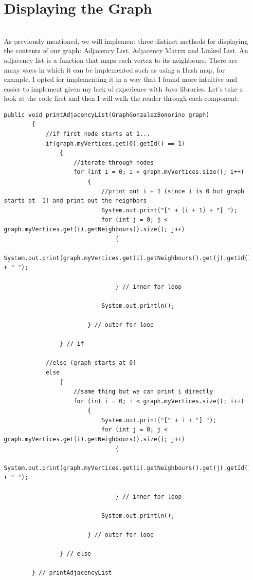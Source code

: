 \documentclass[letterpaper, 10pt]{article}
\begin{document}
\section{Displaying the Graph}
\\
As previously mentioned, we will implement three distinct methods for displaying the contents of our graph: Adjacency List, Adjacency Matrix and Linked List. An adjacency list is a function that maps each vertex to its neighbours. There are many ways in which it can be implemented such as using a Hash map, for example. I opted for implementing it in a way that I found more intuitive and easier to implement given my lack of experience with Java libraries. Let's take a look at the code first and then I will walk the reader through each component:
\\
\begin{lstlisting}
public void printAdjacencyList(GraphGonzalezBonorino graph)
	    {
	        //if first node starts at 1...
	        if(graph.myVertices.get(0).getId() == 1) 
		        {
		            //iterate through nodes
		            for (int i = 0; i < graph.myVertices.size(); i++) 
			            {
			                //print out i + 1 (since i is 0 but graph starts at  1) and print out the neighbors
			                System.out.print("[" + (i + 1) + "] ");
			                for (int j = 0; j < graph.myVertices.get(i).getNeighbours().size(); j++) 
				                {
				                    System.out.print(graph.myVertices.get(i).getNeighbours().get(j).getId() + " ");
				                    
				                } // inner for loop
			                
			                System.out.println();
			                
			            } // outer for loop
		            
		        } // if
	        
	        //else (graph starts at 0)
	        else
		        {
		            //same thing but we can print i directly
		            for (int i = 0; i < graph.myVertices.size(); i++) 
			            {
			                System.out.print("[" + i + "] ");
			                for (int j = 0; j < graph.myVertices.get(i).getNeighbours().size(); j++) 
				                {
				                    System.out.print(graph.myVertices.get(i).getNeighbours().get(j).getId() + " ");
				                    
				                } // inner for loop
			                
			                System.out.println();
			                
			            } // outer for loop
		            
		        } // else
	        
	    } // printAdjacencyList
\end{lstlisting}
\end{document}
